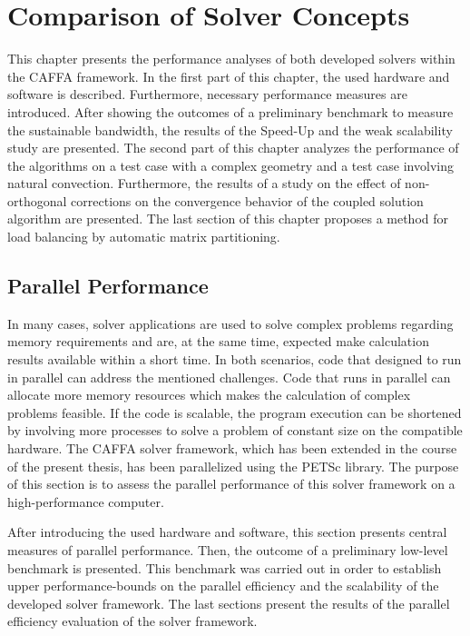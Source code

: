\chapter{Comparison of Solver Concepts}
\label{sec:compare}

This chapter presents the performance analyses of both developed solvers within the CAFFA framework. In the first part of this chapter, the used hardware and software is described. Furthermore, necessary performance measures are introduced. After showing the outcomes of a preliminary benchmark to measure the sustainable bandwidth, the results of the Speed-Up and the weak scalability study are presented. The second part of this chapter analyzes the performance of the algorithms on a test case with a complex geometry and a test case involving natural convection. Furthermore, the results of a study on the effect of non-orthogonal corrections on the convergence behavior of the coupled solution algorithm are presented. The last section of this chapter proposes a method for load balancing by automatic matrix partitioning.
  
\section{Parallel Performance}

In many cases, solver applications are used to solve complex problems regarding memory requirements and are, at the same time, expected make calculation results available within a short time. In both scenarios, code that designed to run in parallel can address the mentioned challenges. Code that runs in parallel can allocate more memory resources which makes the calculation of complex problems feasible. If the code is scalable, the program execution can be shortened by involving more processes to solve a problem of constant size on the compatible hardware. The CAFFA solver framework, which has been extended in the course of the present thesis, has been parallelized using the PETSc library. The purpose of this section is to assess the parallel performance of this solver framework on a high-performance computer.

After introducing the used hardware and software, this section presents central measures of parallel performance. Then, the outcome of a preliminary low-level benchmark is presented. This benchmark was carried out in order to establish upper performance-bounds on the parallel efficiency and the scalability of the developed solver framework. The last sections present the results of the parallel efficiency evaluation of the solver framework.

